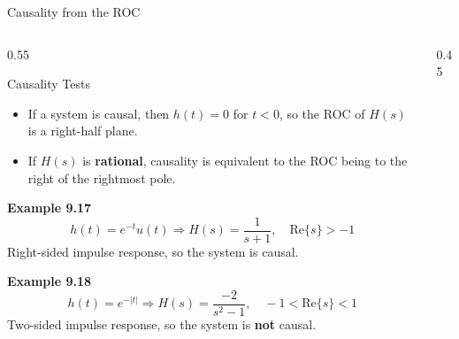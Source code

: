 \begin{frame}[t]{Causality from the ROC}
  \small
  \begin{columns}[T]
    \begin{column}{0.55\textwidth}
      \begin{conceptbox}{Causality Tests}
        \begin{itemize}
          \item If a system is causal, then $h(t)=0$ for $t<0$, so the ROC of $H(s)$ is a right-half plane.
          \item If $H(s)$ is \textbf{rational}, causality is equivalent to the ROC being to the right of the rightmost pole.
        \end{itemize}
      \end{conceptbox}

      \textbf{Example 9.17}
      \[
        h(t)=e^{-t}u(t)
        \Longrightarrow
        H(s)=\frac{1}{s+1},
        \quad \text{Re}\{s\}>-1
      \]
      Right-sided impulse response, so the system is causal.

      \vspace{0.05cm}
      \textbf{Example 9.18}
      \[
        h(t)=e^{-|t|}
        \Longrightarrow
        H(s)=\frac{-2}{s^2-1},
        \quad -1<\text{Re}\{s\}<1
      \]
      Two-sided impulse response, so the system is \textbf{not} causal.
    \end{column}
    \begin{column}{0.45\textwidth}
      \vspace{0.5cm}
      \begin{center}


\end{center}
\end{column}
\end{columns}
\end{frame}
